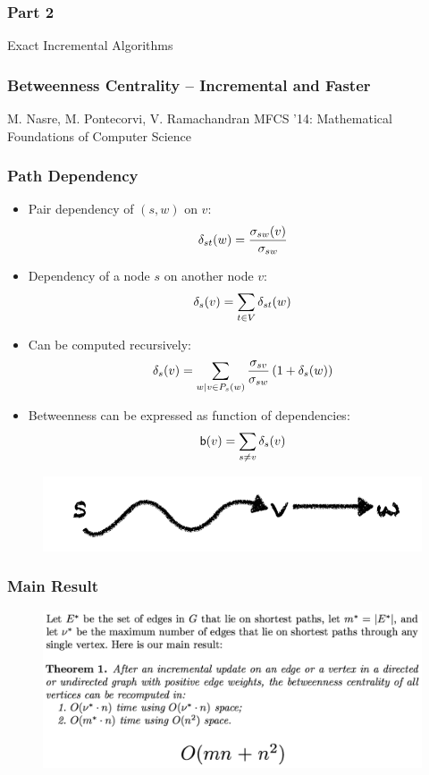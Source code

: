 
\begin{frame}
  \frametitle{Part 2}
  \centering
  \Huge Exact Incremental Algorithms
\end{frame}


\begin{frame}
  \frametitle{Betweenness Centrality -- Incremental and Faster}
  \centering
  \vfill
  {\huge M. Nasre, M. Pontecorvi, V. Ramachandran}
  \vfill
  {\large MFCS '14: Mathematical Foundations of Computer Science}
\end{frame}


\begin{frame}
  \frametitle{Path Dependency}
  
  \begin{itemize}
    \item Pair dependency of $(s,w)$ on $v$:
      \[\delta_{st}(w)=\frac{\sigma_{sw}(v)}{\sigma_{sw}}\]
    \item Dependency of a node $s$ on another node $v$:
      \[\delta_s(v)=\sum_{t \in V}\delta_{st}(w)\]
    \item Can be computed recursively:
    \[
    \delta_s(v)=\sum_{w \mid v \in P_s(w) } \frac{\sigma_{sv}}{\sigma_{sw}} \left( 1 + \delta_{s}(w) \right)
    \]
    \item Betweenness can be expressed as function of dependencies:
      \[ \mathsf{b}(v) = \sum_{s \neq v} \delta_s(v) \]
  \end{itemize}
  
  \begin{figure}[H]
    \centering
    \includegraphics[scale=1]{imgs/path-dependency}
  \end{figure}
\end{frame}


\begin{frame}
  \frametitle{Main Result}

  \begin{figure}[H]
    \centering
    \includegraphics[width=\textwidth]{imgs/npr14-main-result}
  \end{figure}
\end{frame}


